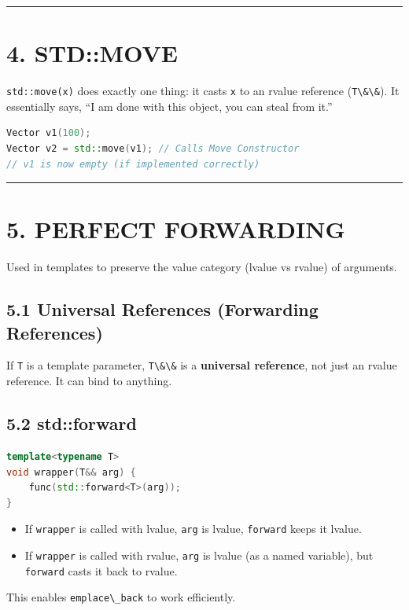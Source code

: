 \begin{center}\rule{0.5\linewidth}{0.5pt}\end{center}

\hypertarget{stdmove}{%
\section{4. STD::MOVE}\label{stdmove}}

\passthrough{\lstinline!std::move(x)!} does exactly one thing: it casts
\passthrough{\lstinline!x!} to an rvalue reference
(\passthrough{\lstinline!T\&\&!}). It essentially says, ``I am done with
this object, you can steal from it.''

\begin{lstlisting}[language={C++}]
Vector v1(100);
Vector v2 = std::move(v1); // Calls Move Constructor
// v1 is now empty (if implemented correctly)
\end{lstlisting}

\begin{center}\rule{0.5\linewidth}{0.5pt}\end{center}

\hypertarget{perfect-forwarding}{%
\section{5. PERFECT FORWARDING}\label{perfect-forwarding}}

Used in templates to preserve the value category (lvalue vs rvalue) of
arguments.

\hypertarget{universal-references-forwarding-references}{%
\subsection{5.1 Universal References (Forwarding
References)}\label{universal-references-forwarding-references}}

If \passthrough{\lstinline!T!} is a template parameter,
\passthrough{\lstinline!T\&\&!} is a \textbf{universal reference}, not
just an rvalue reference. It can bind to anything.

\hypertarget{stdforward}{%
\subsection{5.2 std::forward}\label{stdforward}}

\begin{lstlisting}[language={C++}]
template<typename T>
void wrapper(T&& arg) {
    func(std::forward<T>(arg));
}
\end{lstlisting}

\begin{itemize}
\tightlist
\item
  If \passthrough{\lstinline!wrapper!} is called with lvalue,
  \passthrough{\lstinline!arg!} is lvalue,
  \passthrough{\lstinline!forward!} keeps it lvalue.
\item
  If \passthrough{\lstinline!wrapper!} is called with rvalue,
  \passthrough{\lstinline!arg!} is lvalue (as a named variable), but
  \passthrough{\lstinline!forward!} casts it back to rvalue.
\end{itemize}

This enables \passthrough{\lstinline!emplace\_back!} to work
efficiently.
